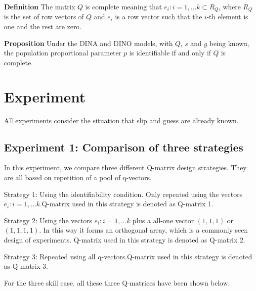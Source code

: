 \documentclass{edm_template}
\begin{document}
\textbf{Definition} \cite{xu2015identifiability}  The matrix $Q$ is complete meaning that ${{e_{i}:i=1,...k}} \subset R_{Q}$, where $R_{Q}$ is the set of row vectors of $Q$ and $e_{i}$ is a row vector such that the $i$-th element is one and the rest are zero.

\textbf{Proposition} \cite{xu2015identifiability} Under the DINA and DINO models, with $Q$, $s$ and $g$ being known, the population proportional parameter $p$ is identifiable if and only if $Q$ is complete.

\section{Experiment}
All experiments consider the situation that slip and guess are already known.

\subsection{Experiment 1: Comparison of three strategies}
In this experiment, we compare three different Q-matrix design strategies. They are all based on repetition of a pool of q-vectors.

Strategy 1: Using the identifiability condition. Only repeated using the vectors ${e_{i}:i=1,...k}$.Q-matrix used in this strategy is denoted as Q-matrix 1.

Strategy 2: Using the vectors ${e_{i}:i=1,...k}$ plus a all-one vector $(1,1,1)$ or $(1,1,1,1)$. In this way it forms an orthogonal array, which is a commonly seen design of experiments. Q-matrix used in this strategy is denoted as Q-matrix 2.

Strategy 3: Repeated using all q-vectors.Q-matrix used in this strategy is denoted as Q-matrix 3.

For the three skill case, all these three Q-matrices have been shown below. 
\end{document}
